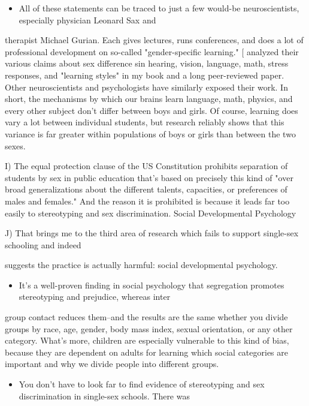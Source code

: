 \documentclass[UTF8,11pt]{ctexart}
\begin{document}
\begin{itemize}[leftmargin=2em,itemsep=.2em,topsep=.4em]\item[H.] All of these statements can be traced to just a few would-be neuroscientists, especially physician Leonard Sax and
\end{itemize}

therapist Michael Gurian. Each gives lectures, runs conferences, and does a lot of professional development on so-called "gender-specific learning." [ analyzed their various claims about sex difference sin hearing, vision, language, math, stress responses, and "learning styles" in my book and a long peer-reviewed paper. Other neuroscientists and psychologists have similarly exposed their work. In short, the mechanisms by which our brains learn language, math, physics, and every other subject don't differ between boys and girls. Of course, learning does vary a lot between individual students, but research reliably shows that this variance is far greater within populations of boys or girls than between the two sexes.


I) The equal protection clause of the US Constitution prohibits separation of students by sex in public education that's based on precisely this kind of "over broad generalizations about the different talents, capacities, or preferences of males and females." And the reason it is prohibited is because it leads far too easily to stereotyping and sex discrimination. Social Developmental Psychology


J) That brings me to the third area of research which fails to support single-sex schooling and indeed


suggests the practice is actually harmful: social developmental psychology.


\begin{itemize}[leftmargin=2em,itemsep=.2em,topsep=.4em]\item[K.] It's a well-proven finding in social psychology that segregation promotes stereotyping and prejudice, whereas inter
\end{itemize}

group contact reduces them--and the results are the same whether you divide groups by race, age, gender, body mass index, sexual orientation, or any other category. What's more, children are especially vulnerable to this kind of bias, because they are dependent on adults for learning which social categories are important and why we divide people into different groups.


\begin{itemize}[leftmargin=2em,itemsep=.2em,topsep=.4em]\item[L.] You don't have to look far to find evidence of stereotyping and sex discrimination in single-sex schools. There was
\end{itemize}
\end{document}

